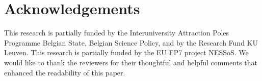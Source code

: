 \documentclass[conference]{IEEEtran}
\begin{document}
\section{Acknowledgements}

This research is partially funded by the Interuniversity Attraction Poles
Programme Belgian State, Belgian Science Policy, and by the Research Fund KU
Leuven. This research is partially funded by the EU FP7 project NESSoS\@. We
would like to thank the reviewers for their thoughtful and helpful comments
that enhanced the readability of this paper.



\end{document}
